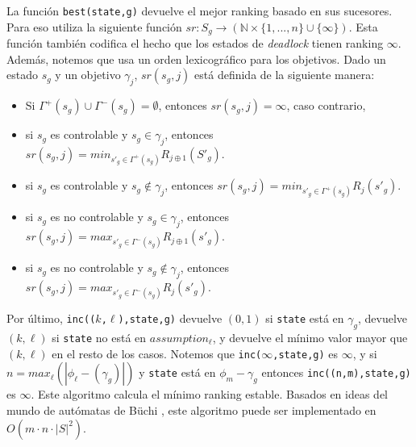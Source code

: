 La función \texttt{best(state,g)} devuelve el mejor ranking basado en sus sucesores. Para eso utiliza la siguiente
función $sr : S_g \rightarrow (\mathbb{N} \times \{1,...,n\} \cup \{\infty\})$. Esta función también codifica el hecho
que los estados de \emph{deadlock} tienen ranking $\infty$. Además, notemos que usa un orden lexicográfico para los
objetivos. Dado un estado $s_g$ y un objetivo $\gamma_j$, $sr(s_g,j)$ está definida de la siguiente manera:

\begin{itemize}
\itemsep-4mm
\item Si $\Gamma^+(s_g) \cup \Gamma^-(s_g) = \emptyset$, entonces $sr(s_g,j) = \infty$, caso contrario,
\item si $s_g$ es controlable y $s_g \in \gamma_j$, entonces $sr(s_g,j) = min_{s'_g \in \Gamma^+(s_g)} R_{j \oplus
1}(S'_g)$.
\item si $s_g$ es controlable y $s_g \notin \gamma_j$, entonces $sr(s_g,j) = min_{s'_g \in \Gamma^+(s_g)} R_j(s'_g)$.
\item si $s_g$ es no controlable y $s_g \in \gamma_j$, entonces $sr(s_g,j) = max_{s'_g \in \Gamma^-(s_g)} R_{j \oplus
1}(s'_g)$.
\item si $s_g$ es no controlable y $s_g \notin \gamma_j$, entonces $sr(s_g,j) = max_{s'_g \in \Gamma^-(s_g)} R_j(s'_g)$.
\end{itemize}

Por último, \texttt{inc(($k$,$\ell$),state,g)} devuelve $(0,1)$ si \texttt{state} está en $\gamma_g$, devuelve $(k,\ell)$ si
\texttt{state} no está en \texttt{$assumption_\ell$}, y devuelve el mínimo valor mayor que $(k,\ell)$ en el resto de los
casos. Notemos que \texttt{inc($\infty$,state,g)} es $\infty$, y si $n = max_\ell(|\phi_\ell-(\gamma_g)|)$ y
\texttt{state} está en $\phi_m-\gamma_g$ entonces \texttt{inc((n,m),state,g)} es $\infty$. Este algoritmo calcula el
mínimo ranking estable. Basados en ideas del mundo de autómatas de Büchi \cite{doi:10.1137/S0097539703420675,
PitermanAndJuvekar}, este algoritmo puede ser implementado
en $O(m \cdot n \cdot |S|^2)$.
